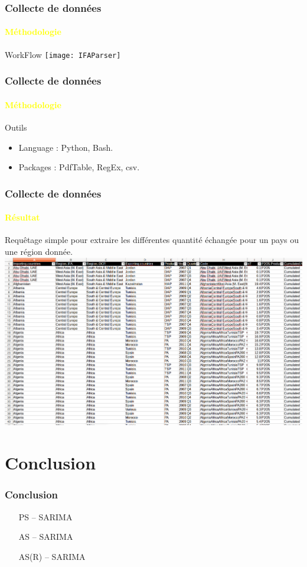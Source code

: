 \documentclass{beamer}
\begin{document}
\begin{frame}
  \frametitle{Collecte de données}
  \framesubtitle{\textbf{\textcolor{yellow}{Méthodologie}}}
	\begin{block}{WorkFlow}
    		\texttt{[image: IFAParser]}
	\end{block}
\end{frame}


\begin{frame}
  \frametitle{Collecte de données}
  \framesubtitle{\textbf{\textcolor{yellow}{Méthodologie}}}

  \begin{block}{Outils}
  	\begin{itemize}
    		\item Language : Python, Bash.
    		\item Packages : PdfTable, RegEx, csv.
  	\end{itemize}
  \end{block}
 \end{frame}
 
 \begin{frame}
  \frametitle{Collecte de données}
  \framesubtitle{\textbf{\textcolor{yellow}{Résultat}}}

  
  Requêtage simple pour extraire les différentes quantité échangée pour un pays ou une région donnée. \\
	\includegraphics[width=\textwidth, height=0.7\textheight, keepaspectratio]{IFAcsv}
  
 \end{frame}

\section{Conclusion}

\begin{frame}
  \frametitle{Conclusion}

  \begin{itemize}
    \item [PS] – SARIMA
    \item [AS] – SARIMA
    \item [AS(R)] – SARIMA
  \end{itemize}
\end{frame}
\end{document}
